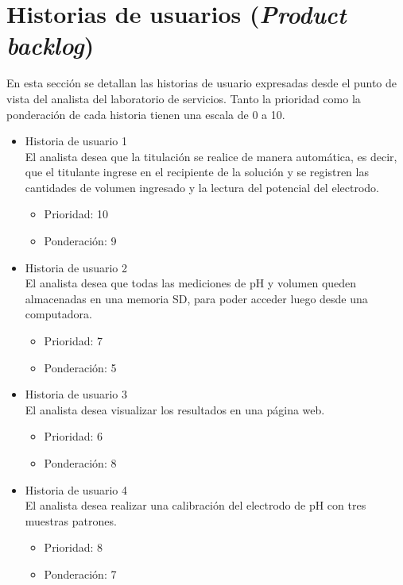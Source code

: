 \documentclass[11pt]{charter}
\begin{document}
\section{Historias de usuarios (\textit{Product backlog})}
\label{sec:backlog}

En esta sección se detallan las historias de usuario expresadas desde el punto de vista del analista del laboratorio de servicios. Tanto la prioridad como la ponderación de cada historia tienen una escala de 0 a 
10.

\begin{itemize}
\item Historia de usuario 1\\El analista desea que la titulación se realice de manera automática, es decir, que el titulante ingrese en el recipiente de la solución y se registren las cantidades de volumen ingresado y la lectura del potencial del electrodo.
	\begin{itemize}
	\item Prioridad: 10
	\item Ponderación: 9
	\end{itemize}

\vspace{25px}

\item Historia de usuario 2\\El analista desea que todas las mediciones de pH y volumen queden almacenadas en una memoria SD, para poder acceder luego desde una computadora.
	\begin{itemize}
	\item Prioridad: 7
	\item Ponderación: 5 
	\end{itemize}

\item Historia de usuario 3\\El analista desea visualizar los resultados en una página web.
	\begin{itemize}
	\item Prioridad: 6
	\item Ponderación: 8
	\end{itemize}
	
\item Historia de usuario 4\\El analista desea realizar una calibración del electrodo de pH con tres muestras patrones.
	\begin{itemize}
	\item Prioridad: 8
	\item Ponderación: 7
	\end{itemize}
	

\end{itemize}
\end{document}
